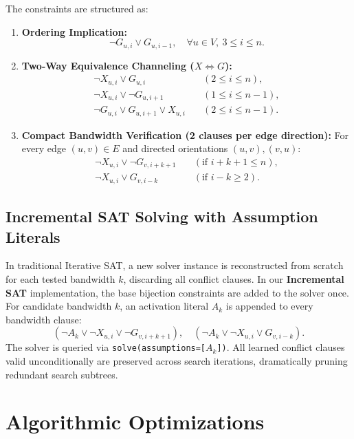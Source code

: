 \documentclass[a4paper,fleqn]{cas-sc}
\begin{document}
The constraints are structured as:
\begin{enumerate}
    \item \textbf{Ordering Implication:}
    \begin{equation}
    \neg G_{u, i} \lor G_{u, i-1}, \quad \forall u \in V, \ 3 \le i \le n.
    \end{equation}
    \item \textbf{Two-Way Equivalence Channeling ($X \iff G$):}
    \begin{align}
    \neg X_{u, i} \lor G_{u, i} \quad &(2 \le i \le n), \\
    \neg X_{u, i} \lor \neg G_{u, i+1} \quad &(1 \le i \le n-1), \\
    \neg G_{u, i} \lor G_{u, i+1} \lor X_{u, i} \quad &(2 \le i \le n-1).
    \end{align}
    \item \textbf{Compact Bandwidth Verification (2 clauses per edge direction):}
    For every edge $(u, v) \in E$ and directed orientations $(u, v), (v, u)$:
    \begin{align}
    \neg X_{u, i} \lor \neg G_{v, i + k + 1} \quad &(\text{if } i + k + 1 \le n), \\
    \neg X_{u, i} \lor G_{v, i - k} \quad &(\text{if } i - k \ge 2).
    \end{align}
\end{enumerate}

\subsection{Incremental SAT Solving with Assumption Literals}
In traditional Iterative SAT, a new solver instance is reconstructed from scratch for each tested bandwidth $k$, discarding all conflict clauses. In our \textbf{Incremental SAT} implementation, the base bijection constraints are added to the solver once. For candidate bandwidth $k$, an activation literal $A_k$ is appended to every bandwidth clause:
\begin{equation}
(\neg A_k \lor \neg X_{u, i} \lor \neg G_{v, i + k + 1}), \quad (\neg A_k \lor \neg X_{u, i} \lor G_{v, i - k}).
\end{equation}
The solver is queried via \texttt{solve(assumptions=[$A_k$])}. All learned conflict clauses valid unconditionally are preserved across search iterations, dramatically pruning redundant search subtrees.

\section{Algorithmic Optimizations}
\end{document}
